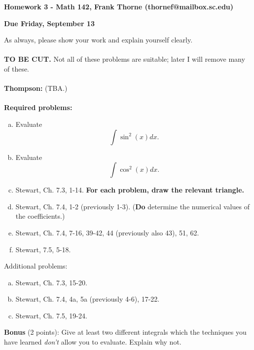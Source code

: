 \documentclass[12pt]{article}
\begin{document}
\setlength{\topmargin}{-2mm}





\begin{center}{\bf Homework 3 - Math 142, Frank Thorne (thornef@mailbox.sc.edu)}
\end{center}
\begin{center}
{\bf Due Friday, September 13}
\end{center}

As always, please show your work and explain yourself clearly. 
\\
\\
{\bf TO BE CUT.} Not all of these problems are suitable; later I will remove many of these.
\\
\\
{\bf Thompson:} (TBA.)
\\
\\
{\bf Required problems:}
\begin{enumerate}[(a)]
\item
Evaluate
$$\int \sin^2(x) dx.$$
\item
Evaluate
$$\int \cos^2(x) dx.$$

\item
Stewart, Ch. 7.3, 1-14. {\bf For each problem, draw the relevant triangle.}

\item
Stewart, Ch. 7.4, 1-2 (previously 1-3). ({\bf Do} determine the numerical values of the coefficients.)

\item
Stewart, Ch. 7.4, 7-16, 39-42, 44 (previously also 43), 51, 62.

\item
Stewart, 7.5, 5-18.

\end{enumerate}
Additional problems:

\begin{enumerate}[(a)]
\item
Stewart, Ch. 7.3, 15-20.
\item
Stewart, Ch. 7.4, 4a, 5a (previously 4-6), 17-22.
\item
Stewart, Ch. 7.5, 19-24.
\end{enumerate}
{\bf Bonus} (2 points):
Give at least two different integrals which the techniques you have learned {\itshape don't}
allow you to evaluate. Explain why not.
\end{document}
